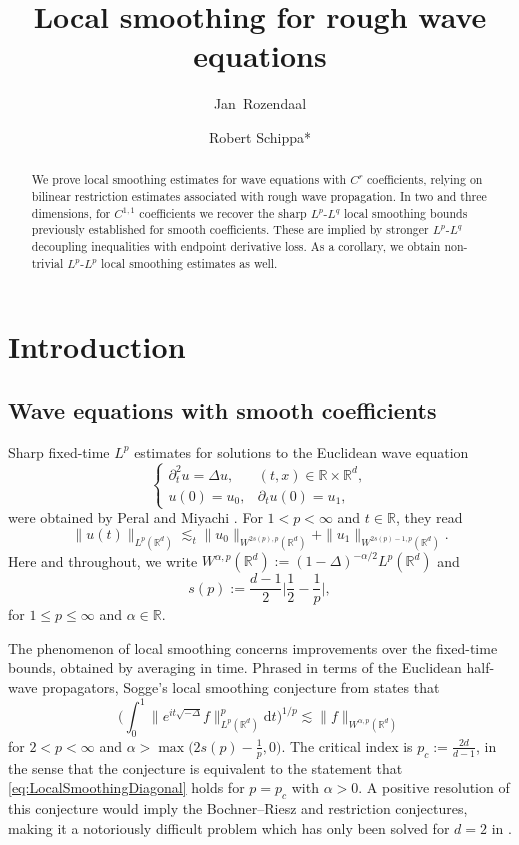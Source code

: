 \documentclass{amsart}
\title{Local smoothing for rough wave equations}
\author{Jan~Rozendaal}
\author[Robert~Schippa]{Robert Schippa*}
\numberwithin{equation}{section}
\theoremstyle{definition}
\newcommand{\R}{\mathbb{R}}
\newcommand{\Rd}{\mathbb{R}^{d}}
\newcommand {\ud}{\mathrm{d}}
\begin{document}
\begin{abstract}
We prove local smoothing estimates for wave equations with $C^{r}$ coefficients, relying on bilinear restriction estimates associated with rough wave propagation. In two and three dimensions, for $C^{1,1}$ coefficients we recover the sharp $L^p$-$L^q$ local smoothing bounds previously established for smooth coefficients. These are implied by stronger $L^{p}$-$L^{q}$ decoupling inequalities with endpoint derivative loss. As a corollary, we obtain non-trivial $L^{p}$-$L^{p}$ local smoothing estimates as well.
\end{abstract}
\maketitle

\section{Introduction}

\subsection{Wave equations with smooth coefficients}


Sharp fixed-time $L^p$ estimates for solutions to the Euclidean wave equation
\[
\begin{cases}
\partial_t^2 u= \Delta u,& (t,x) \in \R \times \R^d, \\
u(0)= u_0,& \partial_{t}u(0) = u_{1},
\end{cases}
\]
were obtained by Peral \cite{Peral1980} and Miyachi \cite{Miyachi1980}. For $1<p<\infty$ and $t\in\R$, they read
\begin{equation}\label{eq:fixedtimeintro}
\| u(t) \|_{L^p(\R^d)} \lesssim_t \| u_0 \|_{W^{2s(p),p}(\Rd)}+\|u_{1}\|_{W^{2s(p)-1,p}(\R^d)}.
\end{equation}
Here and throughout, we write $W^{\alpha,p}(\Rd):=(1-\Delta)^{-\alpha/2}L^{p}(\Rd)$ and 
\begin{equation}\label{eq:sp}
s(p):=\frac{d-1}{2}\Big|\frac{1}{2}-\frac{1}{p}\Big|,
\end{equation}
for $1\leq p\leq \infty$ and $\alpha\in\R$.

The phenomenon of local smoothing concerns improvements over the fixed-time bounds, obtained by averaging in time. Phrased in terms of the Euclidean half-wave propagators, Sogge's local smoothing conjecture from \cite{Sogge1991} states that
\begin{equation}
\label{eq:LocalSmoothingDiagonal}
\Big(\int_{0}^{1}\|e^{it \sqrt{-\Delta}} f\|_{L^{p}(\R^d)}^{p}\ud t\Big)^{1/p} \lesssim \| f \|_{W^{\alpha,p}(\R^d)}
\end{equation}
for $2<p<\infty$ and $\alpha > \max( 2s(p) - \frac{1}{p}, 0 \big)$. 
The critical index is $p_{c}:= \frac{2d}{d-1}$, in the sense that the conjecture is equivalent to the statement that \eqref{eq:LocalSmoothingDiagonal} holds for $p=p_{c}$ with $\alpha > 0$. A positive resolution of this conjecture would imply the Bochner--Riesz and restriction conjectures, making it a notoriously difficult problem which has only been solved for $d=2$ in \cite{GuthWangZhang2020}.
\end{document}
